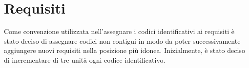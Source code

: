 \section{Requisiti}{
	Come convenzione utilizzata nell'assegnare i codici identificativi ai requisiti è stato deciso di assegnare codici non contigui in modo da poter successivamente aggiungere nuovi requisiti nella posizione più idonea. Inizialmente, è stato deciso di incrementare di tre unità ogni codice identificativo.\\
	
	\newpage
	
	\newpage
	
	\newpage
	
	\newpage
	
}